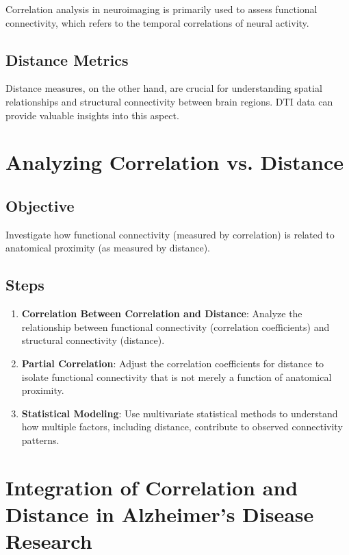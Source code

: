 \documentclass[twocolumn]{article}
\begin{document}
Correlation analysis in neuroimaging is primarily used to assess functional connectivity, which refers to the temporal correlations of neural activity.

\subsection{Distance Metrics}

Distance measures, on the other hand, are crucial for understanding spatial relationships and structural connectivity between brain regions. DTI data
can provide valuable insights into this aspect.

\section{Analyzing Correlation vs. Distance}

\subsection{Objective}

Investigate how functional connectivity (measured by correlation) is related to anatomical proximity (as measured by distance).

\subsection{Steps}

\begin{enumerate}
\item \textbf{Correlation Between Correlation and Distance}: Analyze the relationship between functional connectivity (correlation coefficients) and
structural connectivity (distance).
\item \textbf{Partial Correlation}: Adjust the correlation coefficients for distance to isolate functional connectivity that is not merely a function of
anatomical proximity.
\item \textbf{Statistical Modeling}: Use multivariate statistical methods to understand how multiple factors, including distance, contribute to observed
connectivity patterns.
\end{enumerate}

\section{Integration of Correlation and Distance in Alzheimer's Disease Research}
\end{document}
